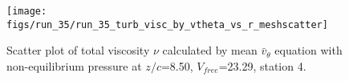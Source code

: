 \begin{figure}[H]
\centering
\texttt{[image: figs/run\_35/run\_35\_turb\_visc\_by\_vtheta\_vs\_r\_meshscatter]}
\caption{Scatter plot of total viscosity $\nu$ calculated by mean $\bar{v}_{\theta}$ equation with non-equilibrium pressure at $z/c$=8.50, $V_{free}$=23.29, station 4.}
\label{fig:run_35_turb_visc_by_vtheta_vs_r_meshscatter}
\end{figure}


